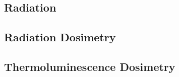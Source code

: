 \documentclass{article}[10pt]
\begin{document}
    \subsection{\large Radiation}

      
    
    \subsection{\large Radiation Dosimetry}
      

    \subsection{\large Thermoluminescence Dosimetry}
        

  
  \newpage
  
  
\end{document}
